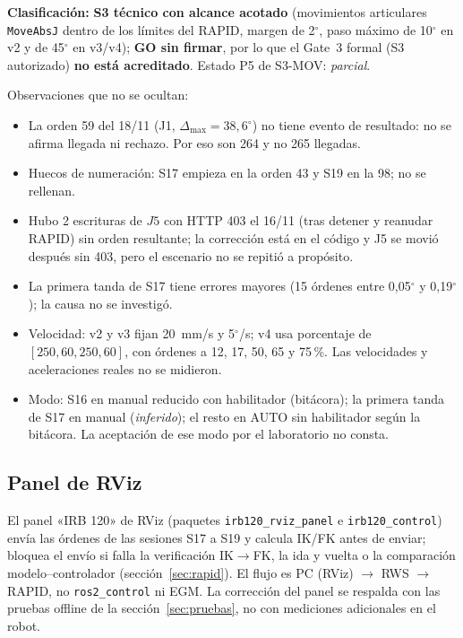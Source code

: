\documentclass[10pt,a4paper]{article}
\begin{document}
\textbf{Clasificación:} \textbf{S3 técnico con alcance acotado} (movimientos articulares \texttt{MoveAbsJ} dentro de los límites del RAPID, margen de 2$^\circ$, paso máximo de 10$^\circ$ en v2 y de 45$^\circ$ en v3/v4); \textbf{GO sin firmar}, por lo que el Gate~3 formal (S3 autorizado) \textbf{no está acreditado}. Estado P5 de S3-MOV: \textit{parcial}.

Observaciones que no se ocultan:
\begin{itemize}[leftmargin=*]
\item La orden 59 del 18/11 (J1, $\Delta_{\max}=38{,}6^\circ$) no tiene evento de resultado: no se afirma llegada ni rechazo. Por eso son 264 y no 265 llegadas.
\item Huecos de numeración: S17 empieza en la orden 43 y S19 en la 98; no se rellenan.
\item Hubo 2 escrituras de $J5$ con HTTP 403 el 16/11 (tras detener y reanudar RAPID) sin orden resultante; la corrección está en el código y J5 se movió después sin 403, pero el escenario no se repitió a propósito.
\item La primera tanda de S17 tiene errores mayores (15 órdenes entre 0,05$^\circ$ y 0,19$^\circ$); la causa no se investigó.
\item Velocidad: v2 y v3 fijan 20~mm/s y 5$^\circ$/s; v4 usa porcentaje de $[250,60,250,60]$, con órdenes a 12, 17, 50, 65 y 75\,\%. Las velocidades y aceleraciones reales no se midieron.
\item Modo: S16 en manual reducido con habilitador (bitácora); la primera tanda de S17 en manual (\textit{inferido}); el resto en AUTO sin habilitador según la bitácora. La aceptación de ese modo por el laboratorio no consta.
\end{itemize}

\subsection{Panel de RViz}
El panel «IRB 120» de RViz (paquetes \texttt{irb120\_rviz\_panel} e \texttt{irb120\_control}) envía las órdenes de las sesiones S17 a S19 y calcula IK/FK antes de enviar; bloquea el envío si falla la verificación IK$\to$FK, la ida y vuelta o la comparación modelo--controlador (sección~\ref{sec:rapid}). El flujo es PC (RViz) $\to$ RWS $\to$ RAPID, no \texttt{ros2\_control} ni EGM. La corrección del panel se respalda con las pruebas offline de la sección~\ref{sec:pruebas}, no con mediciones adicionales en el robot.
\end{document}
